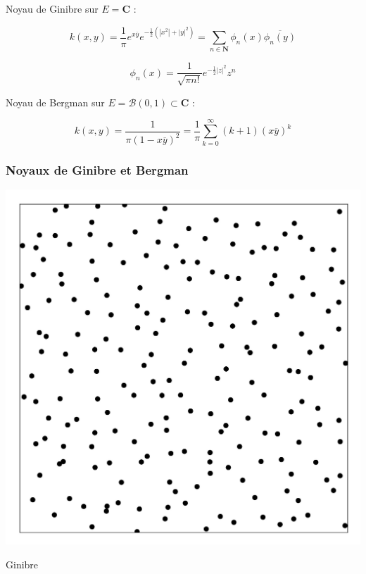 \documentclass[9pt]{beamer}
\begin{document}
\begin{frame}
    Noyau de Ginibre sur $ E = \mathbf C $ : 
    
    $$ k(x,y) = \frac 1 \pi e^{x \overline y} e^{- \frac 1 2 (|x^2| + |y|^2)} = \sum_{n \in \mathbf N} \phi_n(x) \overline{\phi_n(y)}$$

    $$ \phi_n(x) = \frac{1}{\sqrt{\pi n!}} e^{- \frac 1 2 |z|^2} z^n $$

    \bigskip

    Noyau de Bergman sur $ E = \mathcal B(0,1) \subset \mathbf C $ :

    $$ k(x,y) = \frac{1}{\pi(1-x\overline y)^2} = \frac 1 \pi \sum_{k=0}^\infty (k+1)(x \overline y)^k $$

\end{frame}\begin{frame}\frametitle{Noyaux de Ginibre et Bergman}

    \begin{center}

    \includegraphics[scale=0.7]{Points trimmed.jpg} 

    Ginibre


\end{center}
\end{frame}
\end{document}
